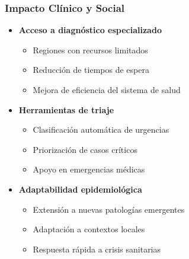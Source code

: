 \begin{frame}
\frametitle{Impacto Clínico y Social}
\begin{itemize}
    \item \textbf{Acceso a diagnóstico especializado}
    \begin{itemize}
        \item Regiones con recursos limitados
        \item Reducción de tiempos de espera
        \item Mejora de eficiencia del sistema de salud
    \end{itemize}
    \item \textbf{Herramientas de triaje}
    \begin{itemize}
        \item Clasificación automática de urgencias
        \item Priorización de casos críticos
        \item Apoyo en emergencias médicas
    \end{itemize}
    \item \textbf{Adaptabilidad epidemiológica}
    \begin{itemize}
        \item Extensión a nuevas patologías emergentes
        \item Adaptación a contextos locales
        \item Respuesta rápida a crisis sanitarias
    \end{itemize}
\end{itemize}
\end{frame}

